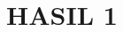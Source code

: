 \vspace{1.5pc}
\vspace{1.5pc}
\section[Hasil 1]{HASIL 1}
\begin{spacing}{1.5}
	
	\lipsum[1-4]
	
\end{spacing}